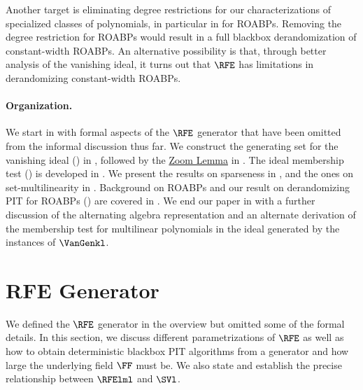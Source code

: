 Another target is eliminating degree restrictions for our characterizations of specialized classes of polynomials, in particular in  for ROABPs.
Removing the degree restriction for ROABPs would result in a full blackbox derandomization of constant-width ROABPs. An alternative possibility is that, through better analysis of the vanishing ideal, it turns out that $\RFE$ has limitations in derandomizing constant-width ROABPs.

\paragraph{Organization.}
We start in  with formal aspects of the $\RFE$ generator that have been omitted from the informal discussion thus far. 
We construct the generating set for the vanishing ideal
() in ,
followed by the \hyperref[lem.multi-zsub-deriv]{Zoom Lemma} in .
The ideal membership test () is developed in
.
We present the results on sparseness in ,
and the ones on set-multilinearity in .
Background on ROABPs and our result on derandomizing PIT for ROABPs
() are covered in .
We end our paper in  with a further discussion
of the alternating algebra representation and an alternate derivation of the membership test for multilinear polynomials in the ideal generated by the instances of $\VanGenkl$.


\section{RFE Generator}
\label{s.rfe-formal}

We defined the $\RFE$ generator in the overview but omitted some of the formal details. In this section, we discuss different parametrizations of $\RFE$ as well as how to obtain deterministic blackbox PIT algorithms from a generator and how large the underlying field $\FF$ must be. We also state and establish the precise relationship between $\RFElml$ and $\SVl$.

